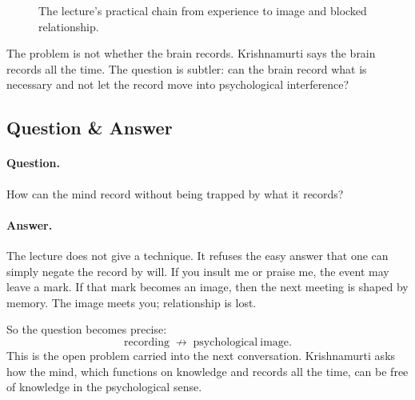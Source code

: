 \begin{figure}
\centering
{}
\caption{The lecture's practical chain from experience to image and blocked relationship.}
\end{figure}

The problem is not whether the brain records. Krishnamurti says the brain records all the time. The question is subtler: can the brain record what is necessary and not let the record move into psychological interference?

\subsection{Question \& Answer}

\paragraph{Question.}
How can the mind record without being trapped by what it records?

\paragraph{Answer.}
The lecture does not give a technique. It refuses the easy answer that one can simply negate the record by will. If you insult me or praise me, the event may leave a mark. If that mark becomes an image, then the next meeting is shaped by memory. The image meets you; relationship is lost.

So the question becomes precise:
\begin{equation}
\mathrm{recording}
\;\not\longrightarrow\;
\mathrm{psychological\ image}.
\end{equation}
This is the open problem carried into the next conversation. Krishnamurti asks how the mind, which functions on knowledge and records all the time, can be free of knowledge in the psychological sense.

